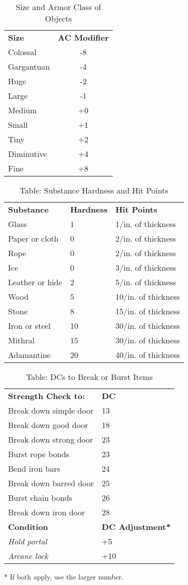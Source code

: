 \begin{table}[htb]
\sffamily
{}
\caption{Size and Armor Class of Objects}
\centering
\begin{tabular}{l c}
\textbf{Size} & \textbf{AC Modifier}\\
Colossal & -8\\
Gargantuan & -4\\
Huge & -2\\
Large & -1\\
Medium & +0\\
Small & +1\\
Tiny & +2\\
Diminutive & +4\\
Fine & +8\\
\end{tabular}
\end{table}


\begin{table}[]
\sffamily
\caption{Table: Substance Hardness and Hit Points}
\begin{tabular}{lll}
\textbf{Substance} & \textbf{Hardness} & \textbf{Hit Points}\\
Glass & 1 & 1/in. of thickness\\
Paper or cloth & 0 & 2/in. of thickness\\
Rope & 0 & 2/in. of thickness\\
Ice & 0 & 3/in. of thickness\\
Leather or hide & 2 & 5/in. of thickness\\
Wood & 5 & 10/in. of thickness\\
Stone & 8 & 15/in. of thickness\\
Iron or steel & 10 & 30/in. of thickness\\
Mithral & 15 & 30/in. of thickness\\
Adamantine & 20 & 40/in. of thickness\\
\end{tabular}
\end{table}

\begin{table}[]
\sffamily
\caption{Table: DCs to Break or Burst Items}
\begin{tabular}{ll}
\textbf{Strength Check to:} & \textbf{DC}\\
Break down simple door & 13\\
Break down good door & 18\\
Break down strong door & 23\\
Burst rope bonds & 23\\
Bend iron bars & 24\\
Break down barred door & 25\\
Burst chain bonds & 26\\
Break down iron door & 28\\
\textbf{Condition} & \textbf{DC Adjustment*}\\
\textit{Hold portal} & +5\\
\textit{Arcane lock} & +10\\
\end{tabular}
* If both apply, use the larger number.
\end{table}
		
